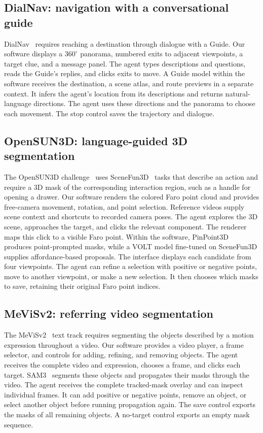 \documentclass{article}
\begin{document}
\subsection{DialNav: navigation with a conversational guide}

DialNav~\citep{han2025dialnav} requires reaching a destination through dialogue with a Guide. Our software displays a $360^\circ$ panorama, numbered exits to adjacent viewpoints, a target clue, and a message panel. The agent types descriptions and questions, reads the Guide's replies, and clicks exits to move. A Guide model within the software receives the destination, a scene atlas, and route previews in a separate context. It infers the agent's location from its descriptions and returns natural-language directions. The agent uses these directions and the panorama to choose each movement. The stop control saves the trajectory and dialogue.

\subsection{OpenSUN3D: language-guided 3D segmentation}

The OpenSUN3D challenge~\citep{opensun3d2026} uses SceneFun3D~\citep{delitzas2024scenefun3d} tasks that describe an action and require a 3D mask of the corresponding interaction region, such as a handle for opening a drawer. Our software renders the colored Faro point cloud and provides free-camera movement, rotation, and point selection. Reference videos supply scene context and shortcuts to recorded camera poses. The agent explores the 3D scene, approaches the target, and clicks the relevant component. The renderer maps this click to a visible Faro point. Within the software, PinPoint3D~\citep{zhang2025pinpoint3d} produces point-prompted masks, while a VOLT model fine-tuned on SceneFun3D supplies affordance-based proposals. The interface displays each candidate from four viewpoints. The agent can refine a selection with positive or negative points, move to another viewpoint, or make a new selection. It then chooses which masks to save, retaining their original Faro point indices.

\subsection{MeViSv2: referring video segmentation}

The MeViSv2~\citep{ding2025mevis} text track requires segmenting the objects described by a motion expression throughout a video. Our software provides a video player, a frame selector, and controls for adding, refining, and removing objects. The agent receives the complete video and expression, chooses a frame, and clicks each target. SAM3~\citep{carion2025sam3} segments these objects and propagates their masks through the video. The agent receives the complete tracked-mask overlay and can inspect individual frames. It can add positive or negative points, remove an object, or select another object before running propagation again. The save control exports the masks of all remaining objects. A no-target control exports an empty mask sequence.
\end{document}
